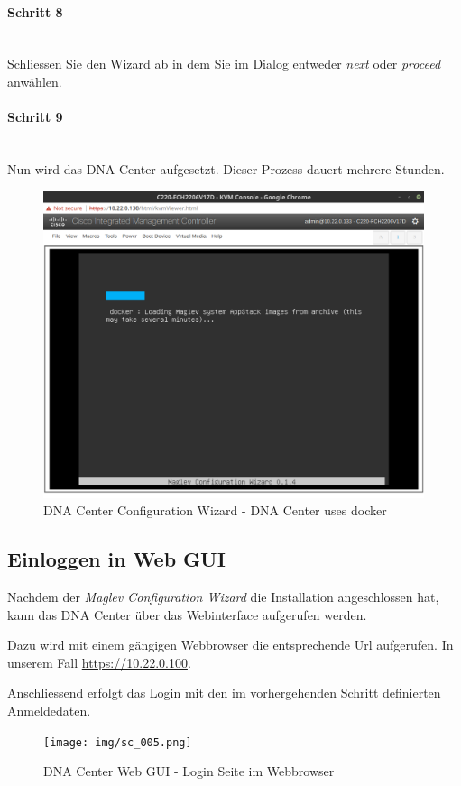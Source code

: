 \paragraph{Schritt 8}
~\\
Schliessen Sie den Wizard ab in dem Sie im Dialog entweder \textit{next} oder \textit{proceed} anwählen.

\paragraph{Schritt 9}
~\\
Nun wird das DNA Center aufgesetzt. Dieser Prozess dauert mehrere Stunden. 

\begin{figure}[H]
	\centering
	\includegraphics[height=9cm]{img/sc_004.png}
	\caption{DNA Center Configuration Wizard - DNA Center uses docker}
	\label{fig:dna-center-install-step-install}
\end{figure}

\subsection{Einloggen in Web GUI}
Nachdem der \textit{Maglev Configuration Wizard} die Installation angeschlossen hat, kann das DNA Center über das Webinterface aufgerufen werden.

Dazu wird mit einem gängigen Webbrowser die entsprechende Url aufgerufen. In unserem Fall \url{https://10.22.0.100}.

Anschliessend erfolgt das Login mit den im vorhergehenden Schritt definierten Anmeldedaten. 

\begin{figure}[H]
	\centering
	\texttt{[image: img/sc\_005.png]}
	\caption{DNA Center Web GUI - Login Seite im Webbrowser}
	\label{fig:installguide-dna-center-gui-1}
\end{figure}

